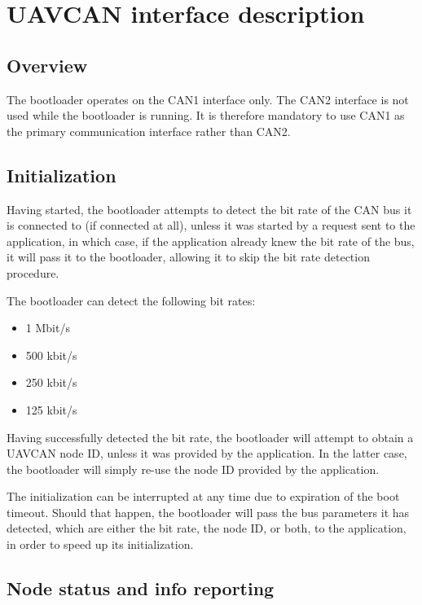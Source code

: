 \documentclass{zubaxdoc}
\begin{document}
\section{UAVCAN interface description}

\subsection{Overview}

The bootloader operates on the CAN1 interface only.
The CAN2 interface is not used while the bootloader is running.
It is therefore mandatory to use CAN1 as the primary communication interface
rather than CAN2.

\subsection{Initialization}

Having started, the bootloader attempts to detect the bit rate of the CAN bus it is connected to
(if connected at all), unless it was started by a request sent to the application, in which case,
if the application already knew the bit rate of the bus, it will pass it to the bootloader,
allowing it to skip the bit rate detection procedure.

The bootloader can detect the following bit rates:
\begin{itemize}
\item 1 Mbit/s
\item 500 kbit/s
\item 250 kbit/s
\item 125 kbit/s
\end{itemize}

Having successfully detected the bit rate, the bootloader will attempt to obtain a UAVCAN node ID,
unless it was provided by the application.
In the latter case, the bootloader will simply re-use the node ID provided by the application.

The initialization can be interrupted at any time due to expiration of the boot timeout.
Should that happen, the bootloader will pass the bus parameters it has detected,
which are either the bit rate, the node ID, or both, to the application,
in order to speed up its initialization.

\subsection{Node status and info reporting}
\end{document}
